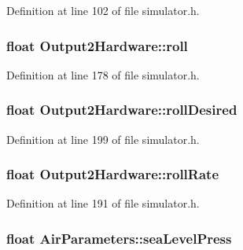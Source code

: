 \-Definition at line 102 of file simulator.\-h.

\hypertarget{group___h_i_t_l_plugin_ga8f2327775c3342e13799a4ed6392f23f}{
\subsubsection[{roll}]{\setlength{\rightskip}{0pt plus 5cm}float {\bf \-Output2\-Hardware\-::roll}}}\label{group___h_i_t_l_plugin_ga8f2327775c3342e13799a4ed6392f23f}


\-Definition at line 178 of file simulator.\-h.

\hypertarget{group___h_i_t_l_plugin_ga56fde0222228b19a5ed9e89efd765da0}{
\subsubsection[{roll\-Desired}]{\setlength{\rightskip}{0pt plus 5cm}float {\bf \-Output2\-Hardware\-::roll\-Desired}}}\label{group___h_i_t_l_plugin_ga56fde0222228b19a5ed9e89efd765da0}


\-Definition at line 199 of file simulator.\-h.

\hypertarget{group___h_i_t_l_plugin_ga81680dc2663395de5b3f4aeaeb9f35f9}{
\subsubsection[{roll\-Rate}]{\setlength{\rightskip}{0pt plus 5cm}float {\bf \-Output2\-Hardware\-::roll\-Rate}}}\label{group___h_i_t_l_plugin_ga81680dc2663395de5b3f4aeaeb9f35f9}


\-Definition at line 191 of file simulator.\-h.

\hypertarget{group___h_i_t_l_plugin_gad886dc623ba9dd1cb06beeb950791c7a}{
\subsubsection[{sea\-Level\-Press}]{\setlength{\rightskip}{0pt plus 5cm}float {\bf \-Air\-Parameters\-::sea\-Level\-Press}}}\label{group___h_i_t_l_plugin_gad886dc623ba9dd1cb06beeb950791c7a}


